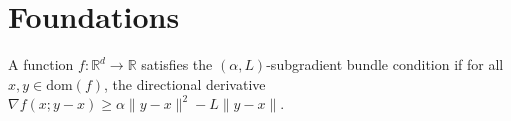 \section{Foundations}
\label{sec:foundations}

\begin{definition}
\label{def:subgradient_bundle}
A function $f: \mathbb{R}^d \to \mathbb{R}$ satisfies the $(\alpha, L)$-subgradient bundle condition if for all $x, y \in \text{dom}(f)$, the directional derivative $\nabla f(x; y - x) \ge \alpha \|y - x\|^2 - L \|y - x\|$.
\end{definition}
